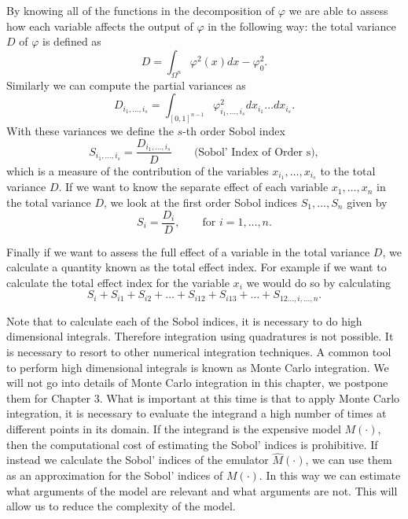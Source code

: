 \documentclass[12pt]{book}
\begin{document}
By knowing all of
the functions in the decomposition of $\varphi$ we are able  to assess how each variable 
affects the output of $\varphi$ in the following way: the total variance $D$ of $\varphi$ is defined as
\begin{equation*}
D=\int_{\Omega^{n}}\varphi^{2}(x)dx-\varphi_{0}^{2}.
\end{equation*}
Similarly we can compute the partial variances as
\begin{equation*}
D_{i_{1},\ldots,i_{s}}=\int_{[0,1]^{n-1}}\varphi^{2}_{i_{1},\ldots,i_{s}}dx_{i_{1}}\ldots dx_{i_{s}}.
\end{equation*}
With these variances we define the $s$-th order  Sobol index  
\begin{equation*} 
S_{i_{1},\ldots,i_{s}}=\frac{D_{i_{1},\ldots,i_{s}}}{D}\qquad\text{(Sobol' Index of Order s)},
\end{equation*}
which is a measure of the contribution of the variables $x_{i_{1}},\ldots,x_{i_{s}}$ to the total variance $D$.
If we want to know the separate effect  of each variable
$x_{1},\ldots,x_{n}$ in the total variance $D$, we look at
the first order Sobol indices $S_{1},\ldots,S_{n}$ given by
\begin{equation*}
S_{i}=\frac{D_{i}}{D},\qquad\text{for }i=1,\ldots,n.
\end{equation*}

Finally if we want to assess the full effect of a  variable  in the total variance $D$, 
we calculate a quantity known 
as the total effect index. For example if we want to calculate the total effect index
for the variable $x_{i}$ we would do so by calculating
\begin{equation*}
S_{i}+S_{i1}+S_{i2}+\ldots+S_{i12}+S_{i13}+\ldots+S_{12\ldots,i,\ldots, n}.
\end{equation*}

Note that  to calculate each of the Sobol indices, it is necessary to do 
high dimensional integrals. Therefore integration using quadratures is not possible.
It is necessary to resort to other numerical integration techniques. A common
tool to perform high dimensional integrals is known as Monte Carlo integration. We will not
go into details of Monte Carlo integration in this chapter, we postpone them for Chapter 3.
What is important at this time is that to apply Monte Carlo integration, it is necessary to 
evaluate the integrand a high number of times at different points in its domain. If the 
integrand is the expensive model $M(\cdot)$, then the computational cost of estimating
the Sobol' indices is prohibitive. If instead we calculate the Sobol' indices 
of the emulator $\widehat{M}(\cdot)$, we can use them as an approximation for the Sobol'
indices of $M(\cdot)$. In this way we can estimate what arguments of the model are 
relevant and what arguments are not. This will allow us to reduce the complexity of the
model.
\end{document}
